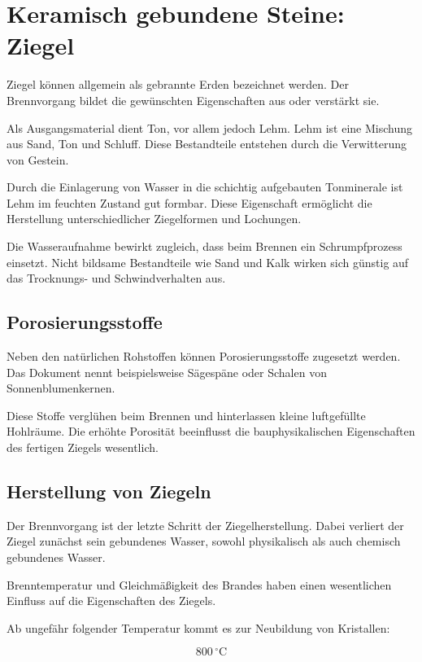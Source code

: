 \documentclass[
  12pt,
  a4paper,
  oneside
]{scrreprt}
\begin{document}
\section{Keramisch gebundene Steine: Ziegel}

Ziegel können allgemein als \glqq gebrannte Erden\grqq{} bezeichnet
werden. Der Brennvorgang bildet die gewünschten Eigenschaften aus oder
verstärkt sie.


Als Ausgangsmaterial dient Ton, vor allem jedoch Lehm. Lehm ist eine
Mischung aus Sand, Ton und Schluff. Diese Bestandteile entstehen durch
die Verwitterung von Gestein.


Durch die Einlagerung von Wasser in die schichtig aufgebauten
Tonminerale ist Lehm im feuchten Zustand gut formbar. Diese Eigenschaft
ermöglicht die Herstellung unterschiedlicher Ziegelformen und Lochungen.


Die Wasseraufnahme bewirkt zugleich, dass beim Brennen ein
Schrumpfprozess einsetzt. Nicht bildsame Bestandteile wie Sand und Kalk
wirken sich günstig auf das Trocknungs- und Schwindverhalten aus.


\subsection{Porosierungsstoffe}

Neben den natürlichen Rohstoffen können Porosierungsstoffe zugesetzt
werden. Das Dokument nennt beispielsweise Sägespäne oder Schalen von
Sonnenblumenkernen.


Diese Stoffe verglühen beim Brennen und hinterlassen kleine
luftgefüllte Hohlräume. Die erhöhte Porosität beeinflusst die
bauphysikalischen Eigenschaften des fertigen Ziegels wesentlich.


\subsection{Herstellung von Ziegeln}

Der Brennvorgang ist der letzte Schritt der Ziegelherstellung. Dabei
verliert der Ziegel zunächst sein gebundenes Wasser, sowohl
physikalisch als auch chemisch gebundenes Wasser.


Brenntemperatur und Gleichmäßigkeit des Brandes haben einen
wesentlichen Einfluss auf die Eigenschaften des Ziegels.


Ab ungefähr folgender Temperatur kommt es zur Neubildung von
Kristallen:

\begin{equation}
  800\,^\circ\mathrm{C}
\end{equation}
\end{document}
